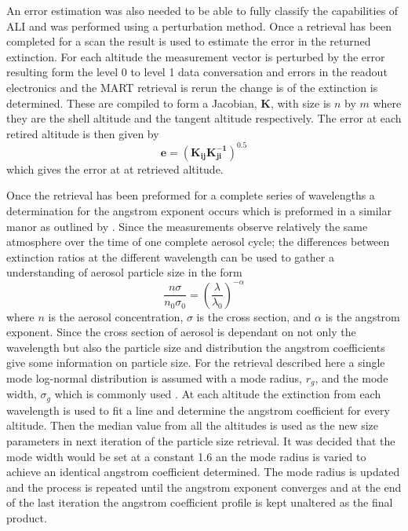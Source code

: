 \documentclass[12pt]{article}
\begin{document}
An error estimation was also needed to be able to fully classify the capabilities of ALI and was performed using a perturbation method. Once a retrieval has been completed for a scan the result is used to estimate the error in the returned extinction. For each altitude the measurement vector is perturbed by the error resulting form the level 0 to level 1 data conversation and errors in the readout electronics and the MART retrieval is rerun the change is of the extinction is determined. These are compiled to form a Jacobian, $\mathbf{K}$, with size is $n$ by $m$ where they are the shell altitude and the tangent altitude respectively. The error at each retired altitude is then given by
\begin{equation}
    \mathbf{e} = \left(\mathbf{K_{ij}}\mathbf{K_{ji}^{-1}}\right)^{0.5}
\end{equation}
which gives the error at at retrieved altitude.

Once the retrieval has been preformed for a complete series of wavelengths a determination for the angstrom exponent occurs which is preformed in a similar manor as outlined by \cite{Rault2013}. Since the measurements observe relatively the same atmosphere over the time of one complete aerosol cycle; the differences between extinction ratios at the different wavelength can be used to gather a understanding of aerosol particle size in the form
\begin{equation}
    \frac{n\sigma}{n_{0}\sigma_{0}} = \left(\frac{\lambda}{\lambda_{0}}\right)^{-\alpha}
    \label{eqn:agstromCoefficient}
\end{equation}
where $n$ is the aerosol concentration, $\sigma$ is the cross section, and $\alpha$ is the angstrom exponent. Since the cross section of aerosol is dependant on not only the wavelength but also the particle size and distribution the angstrom coefficients give some information on particle size. For the retrieval described here a single mode log-normal distribution is assumed with a mode radius, $r_{g}$, and the mode width, $\sigma_{g}$ which is commonly used \citep{Bingen2004}. At each altitude the extinction from each wavelength is used to fit a line and determine the angstrom coefficient for every altitude. Then the median value from all the altitudes is used as the new size parameters in next iteration of the particle size retrieval. It was decided that the mode width would be set at a constant 1.6 an the mode radius is varied to achieve an identical angstrom coefficient determined. The mode radius is updated and the process is repeated until the angstrom exponent converges and at the end of the last iteration the angstrom coefficient profile is kept unaltered as the final product.
\end{document}
